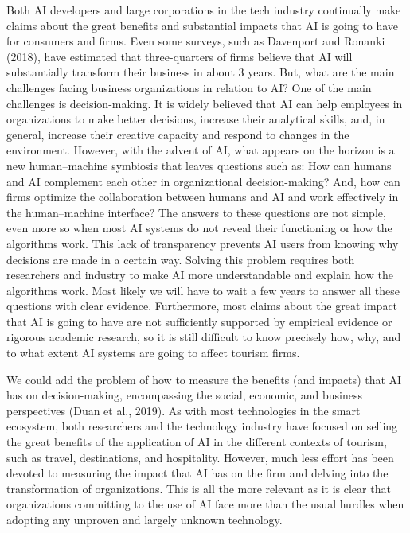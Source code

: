 \documentclass[
  letterpaper,
  DIV=11,
  numbers=noendperiod]{scrreprt}
\begin{document}
Both AI developers and large corporations in the tech industry
continually make claims about the great benefits and substantial impacts
that AI is going to have for consumers and firms. Even some surveys,
such as Davenport and Ronanki (2018), have estimated that three-quarters
of firms believe that AI will substantially transform their business in
about 3 years. But, what are the main challenges facing business
organizations in relation to AI? One of the main challenges is
decision-making. It is widely believed that AI can help employees in
organizations to make better decisions, increase their analytical
skills, and, in general, increase their creative capacity and respond to
changes in the environment. However, with the advent of AI, what appears
on the horizon is a new human--machine symbiosis that leaves questions
such as: How can humans and AI complement each other in organizational
decision-making? And, how can firms optimize the collaboration between
humans and AI and work effectively in the human--machine interface? The
answers to these questions are not simple, even more so when most AI
systems do not reveal their functioning or how the algorithms work. This
lack of transparency prevents AI users from knowing why decisions are
made in a certain way. Solving this problem requires both researchers
and industry to make AI more understandable and explain how the
algorithms work. Most likely we will have to wait a few years to answer
all these questions with clear evidence. Furthermore, most claims about
the great impact that AI is going to have are not sufficiently supported
by empirical evidence or rigorous academic research, so it is still
difficult to know precisely how, why, and to what extent AI systems are
going to affect tourism firms.

We could add the problem of how to measure the benefits (and impacts)
that AI has on decision-making, encompassing the social, economic, and
business perspectives (Duan et al., 2019). As with most technologies in
the smart ecosystem, both researchers and the technology industry have
focused on selling the great benefits of the application of AI in the
different contexts of tourism, such as travel, destinations, and
hospitality. However, much less effort has been devoted to measuring the
impact that AI has on the firm and delving into the transformation of
organizations. This is all the more relevant as it is clear that
organizations committing to the use of AI face more than the usual
hurdles when adopting any unproven and largely unknown technology.
\end{document}
